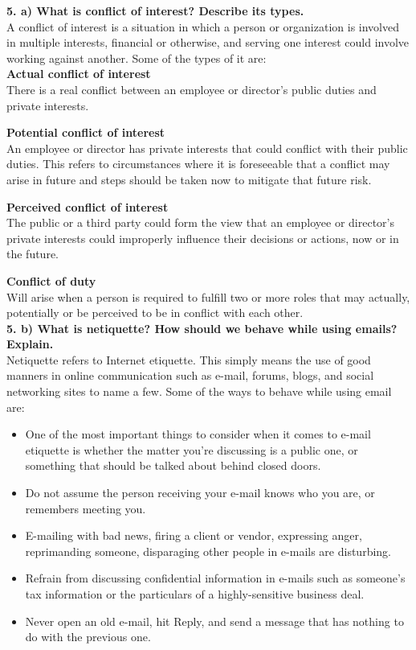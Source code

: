 \documentclass [12pt, a4paper]{article}
\begin{document}
\large
\textbf{5. a) What is conflict of interest? Describe its types.}\\
\normalsize
A conflict of interest is a situation in which a person or organization is involved in multiple interests, financial or otherwise, and serving one interest could involve working against another. Some of the types of it are:\\

\textbf{Actual conflict of interest}\\
There is a real conflict between an employee or director’s public duties and private interests.\\
\par
\textbf{Potential conflict of interest}\\
An employee or director has private interests that could conflict with their public duties. This refers to circumstances where it is foreseeable that a conflict may arise in future and steps should be taken now to mitigate that future risk.\\
\par
\textbf{Perceived conflict of interest}\\
The public or a third party could form the view that an employee or director’s private interests could improperly influence their decisions or actions, now or in the future.\\
\par
\textbf{Conflict of duty}\\
Will arise when a person is required to fulfill two or more roles that may actually, potentially or be perceived to be in conflict with each other.\\

\large
\textbf{5. b) What is netiquette? How should we behave while using emails? Explain.}\\
\normalsize
Netiquette refers to Internet etiquette. This simply means the use of good manners in online communication such as e-mail, forums, blogs, and social networking sites to name a few. Some of the ways to behave while using email are:
\begin{itemize}
	\item One of the most important things to consider when it comes to e-mail etiquette is whether the matter you're discussing is a public one, or something that should be talked about behind closed doors.
	\item Do not assume the person receiving your e-mail knows who you are, or remembers meeting you.
	\item E-mailing with bad news, firing a client or vendor, expressing anger, reprimanding someone, disparaging other people in e-mails are disturbing.
	\item Refrain from discussing confidential information in e-mails such as someone's tax information or the particulars of a highly-sensitive business deal. 
	\item Never open an old e-mail, hit Reply, and send a message that has nothing to do with the previous one. 
\end{itemize}
\end{document}
